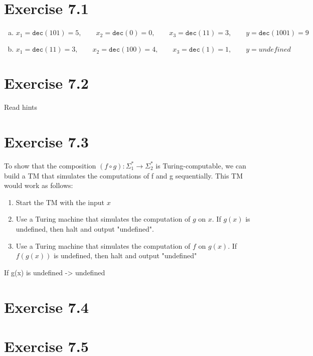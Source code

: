 \documentclass{article} %
\newcommand{\homeworkNumber}{7}
\begin{document}
\section*{Exercise \homeworkNumber.1}
\begin{enumerate}[(a)]
\item
$$
x_1 = \texttt{dec}(101) = 5,\qquad x_2 = \texttt{dec}(0) = 0,\qquad x_3 = \texttt{dec}(11) = 3,\qquad y = \texttt{dec}(1001) = 9
$$
\item
$$
x_1 = \texttt{dec}(11) = 3,\qquad x_2 = \texttt{dec}(100) = 4,\qquad x_3 = \texttt{dec}(1) = 1,\qquad y = \textit{undefined}
$$
\end{enumerate}

\section*{Exercise \homeworkNumber.2}
Read hints

\section*{Exercise \homeworkNumber.3}
To show that the composition $(f \circ g) : \Sigma_1^* \to \Sigma_2^*$ is Turing-computable, we can build a TM that simulates the computations of f and g sequentially. This TM would work as follows:
\begin{enumerate}
\item
Start the TM with the input $x$
\item
Use a Turing machine that simulates the computation of $g$ on $x$. If $g(x)$ is undefined, then halt and output "undefined".
\item
Use a Turing machine that simulates the computation of $f$ on $g(x)$. If $f(g(x))$ is undefined, then halt and output "undefined"
\end{enumerate}

If g(x) is undefined -> undefined
\clearpage


\section*{Exercise \homeworkNumber.4}


\section*{Exercise \homeworkNumber.5}
\end{document}
